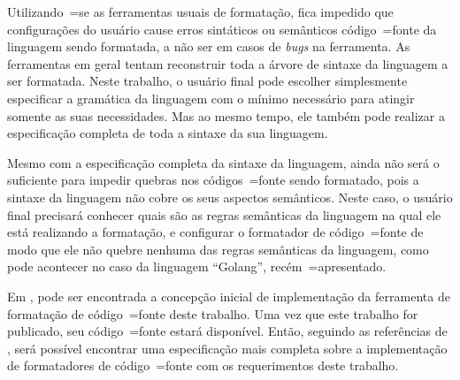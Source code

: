 {    Utilizando~=se as ferramentas usuais de formatação,
    fica impedido que configurações do usuário cause erros sintáticos ou
    semânticos código~=fonte da linguagem sendo formatada,
    a não ser em casos de \textit{bugs} na ferramenta.
    As ferramentas em geral tentam reconstruir toda a árvore de sintaxe da linguagem a ser formatada.
    Neste trabalho,
    o usuário final pode escolher simplesmente especificar a gramática da linguagem com o mínimo necessário para atingir somente as suas necessidades.
    Mas ao mesmo tempo,
    ele também pode realizar a especificação completa de toda a sintaxe da sua linguagem.

    Mesmo com a especificação completa da sintaxe da linguagem,
    ainda não será o suficiente para impedir quebras nos códigos~=fonte sendo formatado,
    pois a sintaxe da linguagem não cobre os seus aspectos semânticos.
    Neste caso,
    o usuário final precisará conhecer quais são as regras semânticas da linguagem na qual ele está realizando a formatação,
    e configurar o formatador de código~=fonte de modo que ele não quebre nenhuma das regras semânticas da linguagem,
    como pode acontecer no caso da linguagem ``Golang'',
    recém~=apresentado.
}

Em ,
pode ser encontrada a concepção inicial de implementação da ferramenta de formatação de código~=fonte deste trabalho.
Uma vez que este trabalho for publicado,
seu código~=fonte estará disponível.
Então,
seguindo as referências de ,
será possível encontrar uma especificação mais completa sobre a implementação de formatadores de código~=fonte com os requerimentos deste trabalho.


\section{}

